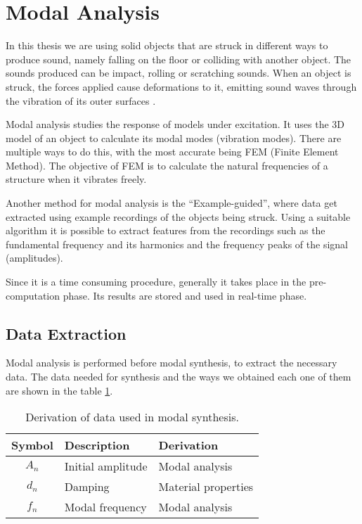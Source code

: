 \section{Modal Analysis}\label{sec:modal_analysis}
In this thesis we are using solid objects that are struck in different ways to produce sound, namely falling on the floor or colliding with another object. The sounds produced can be impact, rolling or scratching sounds. When an object is struck, the forces applied cause deformations to it, emitting sound waves through the vibration of its outer surfaces \cite{van2001foleyautomatic}.

Modal analysis studies the response of models under excitation. It uses the 3D model of an object to calculate its modal modes (vibration modes). There are multiple ways to do this, with the most accurate being \gls{FEM} (Finite Element Method). The objective of \gls{FEM} is to calculate the natural frequencies of a structure when it vibrates freely.

Another method for modal analysis is the ``Example-guided'', where data get extracted using example recordings of the objects being struck. Using a suitable algorithm it is possible to extract features from the recordings such as the fundamental frequency and its harmonics and the frequency peaks of the signal (amplitudes).

Since it is a time consuming procedure, generally it takes place in the pre-computation phase. Its results are stored and used in real-time phase.


\subsection{Data Extraction}\label{sec:data_extract}
Modal analysis is performed before modal synthesis, to extract the necessary data. The data needed for synthesis and the ways we obtained each one of them are shown in the table \ref{tab:extracted_data}.

\begin{table}[H]
	\centering
    \begin{tabular}{ c l l }
    \toprule
    \textbf{Symbol} & \textbf{Description} & \textbf{Derivation} \\ \toprule
    $A_n$ & Initial amplitude & Modal analysis \\ 
    $d_n$ & Damping & Material properties \\ 
    $f_n$ & Modal frequency & Modal analysis \\
    \bottomrule
    \end{tabular}
    \caption{Derivation of data used in modal synthesis.}
    \label{tab:extracted_data}
\end{table} 

